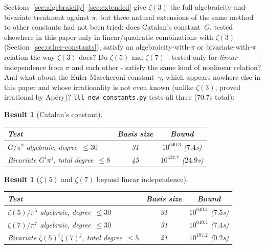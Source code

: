 \documentclass[12pt]{article}
\newtheorem{result}[theorem]{Result}
\theoremstyle{definition}
\theoremstyle{remark}
\begin{document}
Sections~\ref{sec:algebraicity}--\ref{sec:extended} give
$\zeta(3)$ the full algebraicity-and-bivariate treatment against
$\pi$, but three natural extensions of the same method to other
constants had not been tried: does Catalan's constant~$G$, tested
elsewhere in this paper only in linear/quadratic combinations with
$\zeta(3)$ (Section~\ref{sec:other-constants}), satisfy an
algebraicity-with-$\pi$ or bivariate-with-$\pi$ relation the way
$\zeta(3)$ does?  Do $\zeta(5)$ and $\zeta(7)$ - tested only for
\emph{linear} independence from $\pi$ and each other - satisfy the
same kind of nonlinear relation?  And what about the
Euler-Mascheroni constant~$\gamma$, which appears nowhere else in
this paper and whose irrationality is not even known (unlike
$\zeta(3)$, proved irrational by Ap\'ery)?  \texttt{lll\_new\_constants.py}
tests all three ($70.7$s total):

\begin{result}[Catalan's constant]\label{res:new-catalan}
\begin{center}
\begin{tabular}{@{}lcc@{}}
\toprule
Test & Basis size & Bound \\
\midrule
$G/\pi^2$ algebraic, degree~$\le 30$ & 31 & $10^{640.3}$ ($7.4$s) \\
Bivariate $G^i\pi^j$, total degree~$\le 8$ & 45 & $10^{437.7}$ ($24.9$s) \\
\bottomrule
\end{tabular}
\end{center}
\end{result}

\begin{result}[$\zeta(5)$ and $\zeta(7)$ beyond linear independence]\label{res:new-oddzeta}
\begin{center}
\begin{tabular}{@{}lcc@{}}
\toprule
Test & Basis size & Bound \\
\midrule
$\zeta(5)/\pi^5$ algebraic, degree~$\le 30$ & 31 & $10^{640.4}$ ($7.5$s) \\
$\zeta(7)/\pi^7$ algebraic, degree~$\le 30$ & 31 & $10^{640.4}$ ($7.4$s) \\
Bivariate $\zeta(5)^i\zeta(7)^j$, total degree~$\le 5$ & 21 & $10^{187.2}$ ($0.2$s) \\
\bottomrule
\end{tabular}
\end{center}
\end{result}
\end{document}
